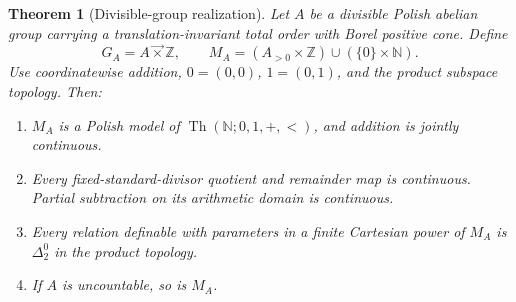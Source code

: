 \documentclass[11pt]{article}
\numberwithin{equation}{section}
\newtheorem{theorem}{Theorem}[section]
\theoremstyle{definition}
\theoremstyle{remark}
\newcommand{\N}{\mathbb N}
\newcommand{\Z}{\mathbb Z}
\newcommand{\lex}{\mathbin{\overrightarrow\times}}
\newcommand{\Th}{\operatorname{Th}}
\begin{document}
\begin{theorem}[Divisible-group realization]
\label{pma:cp:thm:general}
Let $A$ be a divisible Polish abelian group carrying a translation-invariant
total order with Borel positive cone. Define
\begin{equation}
\label{pma:cp:eq:generalmodel}
G_A=A\lex\Z,\qquad
M_A=(A_{>0}\times\Z)\cup(\{0\}\times\N).
\end{equation}
Use coordinatewise addition, $0=(0,0)$, $1=(0,1)$, and the product subspace
topology. Then:
\begin{enumerate}[label=(\roman*)]
\item $M_A$ is a Polish model of $\Th(\N;0,1,+,<)$, and addition is jointly continuous.
\item Every fixed-standard-divisor quotient and remainder map is continuous.
Partial subtraction on its arithmetic domain is continuous.
\item Every relation definable with parameters in a finite Cartesian power
of $M_A$ is $\Delta^0_2$ in the product topology.
\item If $A$ is uncountable, so is $M_A$.
\end{enumerate}
\end{theorem}
\end{document}
